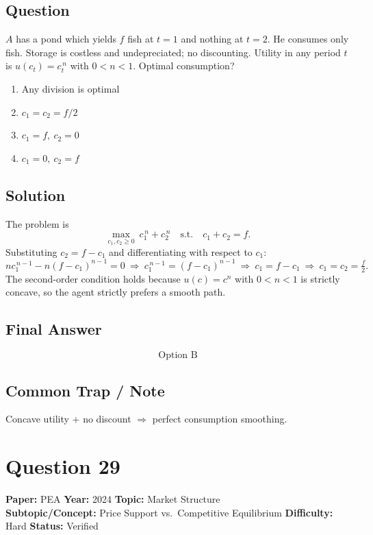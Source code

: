 \documentclass[11pt]{article}
\begin{document}
\subsection*{Question}
$A$ has a pond which yields $f$ fish at $t=1$ and nothing at $t=2$. He consumes only fish. Storage is costless and undepreciated; no discounting. Utility in any period $t$ is $u(c_t)=c_t^{\,n}$ with $0<n<1$. Optimal consumption?
\begin{enumerate}[label=(\Alph*)]
\item Any division is optimal
\item $c_1=c_2=f/2$
\item $c_1=f,\ c_2=0$
\item $c_1=0,\ c_2=f$
\end{enumerate}

\subsection*{Solution}
The problem is
\[
\max_{c_1,c_2\ge 0}\ c_1^{\,n}+c_2^{\,n}\quad\text{s.t.}\quad c_1+c_2=f.
\]
Substituting $c_2=f-c_1$ and differentiating with respect to $c_1$:
\[
nc_1^{\,n-1}-n(f-c_1)^{n-1}=0\ \Longrightarrow\ c_1^{\,n-1}=(f-c_1)^{n-1}\ \Longrightarrow\ c_1=f-c_1\ \Longrightarrow\ c_1=c_2=\tfrac{f}{2}.
\]
The second-order condition holds because $u(c)=c^{n}$ with $0<n<1$ is strictly concave, so the agent strictly prefers a smooth path.

\subsection*{Final Answer}
\[
\boxed{\text{Option B}}
\]

\subsection*{Common Trap / Note}
Concave utility + no discount $\Rightarrow$ perfect consumption smoothing.

\section*{Question 29}
\textbf{Paper:} PEA \quad \textbf{Year:} 2024 \quad \textbf{Topic:} Market Structure \\
\textbf{Subtopic/Concept:} Price Support vs.\ Competitive Equilibrium \quad \textbf{Difficulty:} Hard \quad \textbf{Status:} Verified
\end{document}
